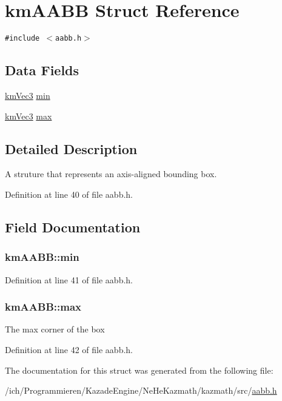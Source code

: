 \hypertarget{structkm_a_a_b_b}{
\section{kmAABB Struct Reference}
\label{structkm_a_a_b_b}
}
{\tt \#include $<$aabb.h$>$}

\subsection*{Data Fields}
\begin{CompactItemize}
\item 
\hyperlink{structkm_vec3}{kmVec3} \hyperlink{structkm_a_a_b_b_511f76c686209fd071eb8aed2d52b0ac}{min}
\item 
\hyperlink{structkm_vec3}{kmVec3} \hyperlink{structkm_a_a_b_b_b408e258b39d873882e2b3b335cf88d7}{max}
\end{CompactItemize}


\subsection{Detailed Description}
A struture that represents an axis-aligned bounding box. 

Definition at line 40 of file aabb.h.

\subsection{Field Documentation}
\hypertarget{structkm_a_a_b_b_511f76c686209fd071eb8aed2d52b0ac}{
\subsubsection[min]{ {\bf kmAABB::min}}}
\label{structkm_a_a_b_b_511f76c686209fd071eb8aed2d52b0ac}




Definition at line 41 of file aabb.h.\hypertarget{structkm_a_a_b_b_b408e258b39d873882e2b3b335cf88d7}{
\subsubsection[max]{ {\bf kmAABB::max}}}
\label{structkm_a_a_b_b_b408e258b39d873882e2b3b335cf88d7}


The max corner of the box 

Definition at line 42 of file aabb.h.

The documentation for this struct was generated from the following file:\begin{CompactItemize}
\item 
/ich/Programmieren/KazadeEngine/NeHeKazmath/kazmath/src/\hyperlink{aabb_8h}{aabb.h}\end{CompactItemize}
